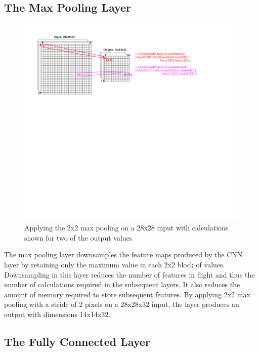 \documentclass[epsfig,10pt,fullpage]{article}
\begin{document}
\subsection*{The Max Pooling Layer}

\begin{figure}[H]
   \begin{center}
       \hspace*{0.1cm}\includegraphics[scale=0.7]{figures/fig_pooling_layer}
   \end{center}
   \caption{Applying the 2x2 max pooling on a 28x28 input with calculations shown for two of the output values}
	\label{fig:pooling_layer}
\end{figure}

The max pooling layer downsamples the feature maps produced by the CNN layer by retaining only the maximum value in each 2x2 block
of values. Downsampling in this layer reduces the number of features in flight  and thus the number of calculations required in the subsequent layers.
It also reduces the amount of memory required to store subsequent  features.
By applying 2x2 max pooling with a stride of 2 pixels on a 28x28x32 input, the layer produces an output with dimensions 14x14x32. 

\subsection*{The Fully Connected Layer}
\end{document}
